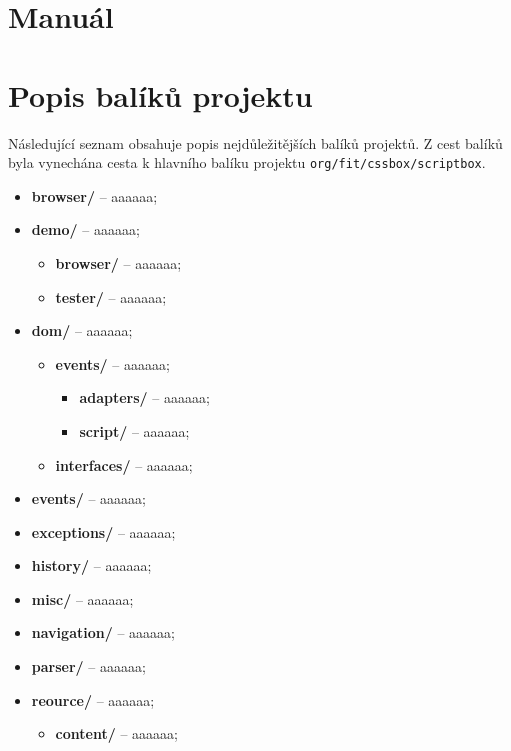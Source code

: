 \chapter{Manuál}
\label{Annex.manual}

\chapter{Popis balíků projektu}
\label{Annex.packageDescription}

Následující seznam obsahuje popis nejdůležitějších balíků projektů. Z cest balíků byla vynechána 
cesta k hlavního balíku projektu \texttt{org/fit/cssbox/scriptbox}.

\begin{itemize}
  \item[] \textbf{browser/} -- aaaaaa;
  \item[] \textbf{demo/} -- aaaaaa;
     \begin{itemize}
       \item[] \textbf{browser/} -- aaaaaa;
       \item[] \textbf{tester/} -- aaaaaa;
     \end{itemize}
  \item[] \textbf{dom/} -- aaaaaa;
     \begin{itemize}
       \item[] \textbf{events/} -- aaaaaa;
         \begin{itemize}
           \item[] \textbf{adapters/} -- aaaaaa;
           \item[] \textbf{script/} -- aaaaaa;
         \end{itemize}
       \item[] \textbf{interfaces/} -- aaaaaa;
     \end{itemize}
  \item[] \textbf{events/} -- aaaaaa;
  \item[] \textbf{exceptions/} -- aaaaaa;
  \item[] \textbf{history/} -- aaaaaa;
  \item[] \textbf{misc/} -- aaaaaa;
  \item[] \textbf{navigation/} -- aaaaaa;
  \item[] \textbf{parser/} -- aaaaaa;
  \item[] \textbf{reource/} -- aaaaaa;
     \begin{itemize}
       \item[] \textbf{content/} -- aaaaaa;
         \begin{itemize}

\end{itemize}
\end{itemize}
\end{itemize}
